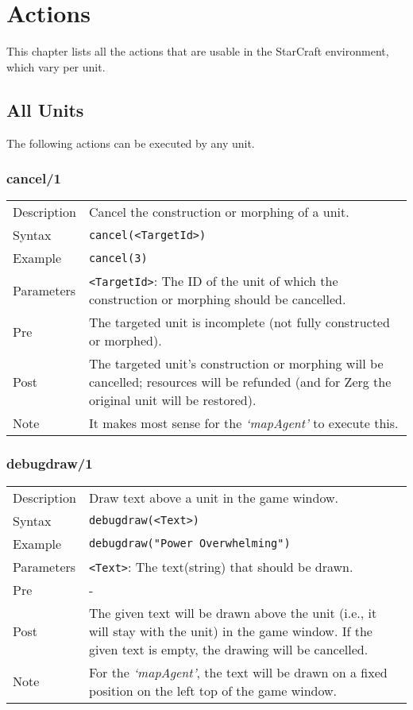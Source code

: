 \chapter{Actions}

This chapter lists all the actions that are usable in the StarCraft environment, which vary per unit.

\section{All Units}
The following actions can be executed by any unit.

\subsection{cancel/1}
\begin{tabularx}{\textwidth}{lX}
 Description & Cancel the construction or morphing of a unit. \\
 Syntax & \verb|cancel(<TargetId>)| \\
 Example & \verb|cancel(3)| \\
 Parameters & \verb|<TargetId>|: The ID of the unit of which the construction or morphing should be cancelled. \\
 Pre & The targeted unit is incomplete (not fully constructed or morphed). \\
 Post & The targeted unit's construction or morphing will be cancelled; resources will be refunded (and for Zerg the original unit will be restored). \\
 Note & It makes most sense for the \textit{`mapAgent'} to execute this.
\end{tabularx}

\subsection{debugdraw/1}
\begin{tabularx}{\textwidth}{lX}
 Description & Draw text above a unit in the game window. \\
 Syntax & \verb|debugdraw(<Text>)| \\
 Example & \verb|debugdraw("Power Overwhelming")| \\
 Parameters & \verb|<Text>|: The text(string) that should be drawn. \\
 Pre & - \\
 Post & The given text will be drawn above the unit (i.e., it will stay with the unit) in the game window. If the given text is empty, the drawing will be cancelled. \\
 Note & For the \textit{`mapAgent'}, the text will be drawn on a fixed position on the left top of the game window.
\end{tabularx}

